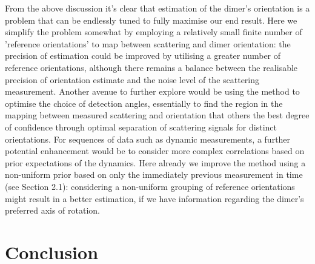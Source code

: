 \documentclass[preprint,  3p]{elsarticle}
\begin{document}
From the above discussion it’s clear that estimation of the dimer’s orientation is a problem that can be endlessly tuned to fully maximise our end result. Here we simplify the problem somewhat by employing a relatively small finite number of 'reference orientations' to map between scattering and dimer orientation: the precision of estimation could be improved by utilising a greater number of reference orientations, although there remains a balance between the realisable precision of orientation estimate and the noise level of the scattering measurement. Another avenue to further explore would be using the method to optimise the choice of detection angles, essentially to find the region in the mapping between measured scattering and orientation that others the best degree of confidence through optimal separation of scattering signals for distinct orientations. For sequences of data such as dynamic measurements, a further potential enhancement would be to consider more complex correlations based on prior expectations of the dynamics. Here already we improve the method using a non-uniform prior based on only the immediately previous measurement in time (see Section 2.1): considering a non-uniform grouping of reference orientations might result in a better estimation, if we have information regarding the dimer’s preferred axis of rotation. 

\section{Conclusion}
\label{sec:Conclusion}
\end{document}
